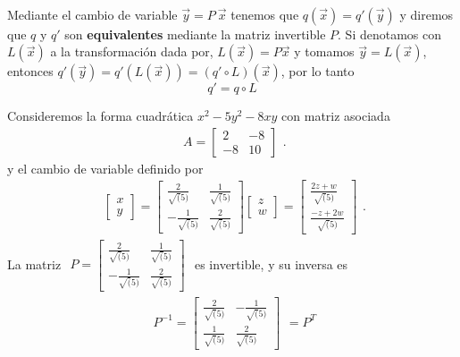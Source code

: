 \paragraph*{}
Mediante el cambio de variable $\overrightarrow{y} = P~\overrightarrow{x}$ tenemos que $q(\overrightarrow{x}) = q'(\overrightarrow{y})$ y diremos que $q$ y $q'$ son \textbf{equivalentes} mediante la matriz invertible $P$. Si denotamos con $L(\overrightarrow{x})$ a la transformación dada por, $L(\overrightarrow{x}) = P\overrightarrow{x}$ y tomamos $\overrightarrow{y} = L(\overrightarrow{x})$, entonces $q'(\overrightarrow{y}) = q'\left(L(\overrightarrow{x})\right) = \left(q' \circ L\right)(\overrightarrow{x})$, por lo tanto
\begin{equation*}
q' = q \circ L
\end{equation*}
\begin{example}
Consideremos la forma cuadrática $x^{2} - 5y^{2} - 8xy$ con matriz asociada
\begin{equation*}
    \begin{matrix} 
    A = \begin{bmatrix}
2 & -8\\
-8 & 10
\end{bmatrix}
    \end{matrix}.
\end{equation*}
y el cambio de variable definido por
\begin{equation*}
    \begin{matrix} 
    \begin{bmatrix}
        x\\
        y
    \end{bmatrix} = \begin{bmatrix}
    \frac{2}{\sqrt(5)} & \frac{1}{\sqrt(5)}\\
    -\frac{1}{\sqrt(5)} & \frac{2}{\sqrt(5)}
    \end{bmatrix}\begin{bmatrix}
    z\\
    w
    \end{bmatrix} = \begin{bmatrix}
        \frac{2z + w}{\sqrt(5)}\\
        \frac{-z + 2w}{\sqrt(5)}
        \end{bmatrix}
    \end{matrix}.
\end{equation*}
La matriz $ \begin{matrix} 
    P = \begin{bmatrix}
\frac{2}{\sqrt(5)} & \frac{1}{\sqrt(5)}\\
-\frac{1}{\sqrt(5)} & \frac{2}{\sqrt(5)}
\end{bmatrix}
    \end{matrix}$ es invertible, y su inversa es 
\begin{equation*}
    \begin{matrix} 
    P^{-1} = \begin{bmatrix}
\frac{2}{\sqrt(5)} & -\frac{1}{\sqrt(5)}\\
\frac{1}{\sqrt(5)} & \frac{2}{\sqrt(5)}
\end{bmatrix}
    \end{matrix} = P^{T}
\end{equation*}


\end{example}
